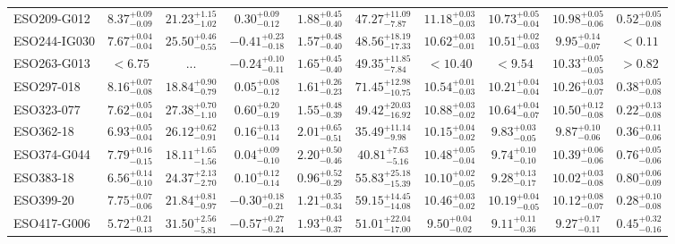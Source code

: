 \documentclass[onecolumn]{mn2e}
\begin{document}
\begin{landscape}
{\begin{center}
\begin{longtable}{lccccccccc}
ESO209-G012 & $8.37_{-0.09}^{+0.09}$ & $21.23_{-1.02}^{+1.15}$ & $0.30_{-0.12}^{+0.09}$ & $1.88_{-0.40}^{+0.45}$ &$47.27_{-7.87}^{+11.09}$ & $11.18_{-0.03}^{+0.03}$ & $10.73_{-0.04}^{+0.05}$ & $10.98_{-0.06}^{+0.05}$ & $0.52_{-0.08}^{+0.05}$ \\
ESO244-IG030 & $7.67_{-0.04}^{+0.04}$ & $25.50_{-0.55}^{+0.46}$ & $-0.41_{-0.18}^{+0.23}$ & $1.57_{-0.40}^{+0.48}$ &$48.56_{-17.33}^{+18.19}$ & $10.62_{-0.01}^{+0.03}$ & $10.51_{-0.03}^{+0.02}$ & $9.95_{-0.07}^{+0.14}$ & $<0.11$ \\
ESO263-G013 & $<6.75$ & ... & $-0.24_{-0.11}^{+0.10}$ & $1.65_{-0.40}^{+0.45}$ &$49.35_{-7.84}^{+11.85}$ & $<10.40$ & $<9.54$ & $10.33_{-0.05}^{+0.05}$ & $>0.82$ \\
ESO297-018 & $8.16_{-0.08}^{+0.07}$ & $18.84_{-0.79}^{+0.90}$ & $0.05_{-0.12}^{+0.08}$ & $1.61_{-0.23}^{+0.26}$ &$71.45_{-10.75}^{+12.98}$ & $10.54_{-0.03}^{+0.01}$ & $10.21_{-0.04}^{+0.04}$ & $10.26_{-0.07}^{+0.03}$ & $0.38_{-0.08}^{+0.05}$ \\
ESO323-077 & $7.62_{-0.04}^{+0.05}$ & $27.38_{-1.10}^{+0.70}$ & $0.60_{-0.19}^{+0.20}$ & $1.55_{-0.39}^{+0.48}$ &$49.42_{-16.92}^{+20.03}$ & $10.88_{-0.02}^{+0.03}$ & $10.64_{-0.07}^{+0.04}$ & $10.50_{-0.08}^{+0.12}$ & $0.22_{-0.08}^{+0.13}$ \\
ESO362-18 & $6.93_{-0.04}^{+0.05}$ & $26.12_{-0.91}^{+0.62}$ & $0.16_{-0.14}^{+0.13}$ & $2.01_{-0.51}^{+0.65}$ &$35.49_{-9.98}^{+11.14}$ & $10.15_{-0.02}^{+0.04}$ & $9.83_{-0.05}^{+0.03}$ & $9.87_{-0.06}^{+0.10}$ & $0.36_{-0.06}^{+0.11}$ \\
ESO374-G044 & $7.79_{-0.15}^{+0.16}$ & $18.11_{-1.56}^{+1.65}$ & $0.04_{-0.10}^{+0.09}$ & $2.20_{-0.46}^{+0.50}$ &$40.81_{-5.16}^{+7.63}$ & $10.48_{-0.04}^{+0.05}$ & $9.74_{-0.10}^{+0.10}$ & $10.39_{-0.06}^{+0.06}$ & $0.76_{-0.06}^{+0.05}$ \\
ESO383-18 & $6.56_{-0.10}^{+0.14}$ & $24.37_{-2.70}^{+2.13}$ & $0.10_{-0.14}^{+0.12}$ & $0.96_{-0.29}^{+0.52}$ &$55.83_{-15.39}^{+25.18}$ & $10.10_{-0.05}^{+0.02}$ & $9.28_{-0.17}^{+0.13}$ & $10.02_{-0.08}^{+0.03}$ & $0.80_{-0.09}^{+0.06}$ \\
ESO399-20 & $7.75_{-0.06}^{+0.07}$ & $21.84_{-0.97}^{+0.81}$ & $-0.30_{-0.21}^{+0.18}$ & $1.21_{-0.34}^{+0.35}$ &$59.15_{-14.08}^{+14.45}$ & $10.46_{-0.02}^{+0.03}$ & $10.19_{-0.05}^{+0.04}$ & $10.12_{-0.07}^{+0.08}$ & $0.28_{-0.08}^{+0.10}$ \\
ESO417-G006 & $5.72_{-0.13}^{+0.21}$ & $31.50_{-5.81}^{+2.56}$ & $-0.57_{-0.24}^{+0.27}$ & $1.93_{-0.37}^{+0.43}$ &$51.01_{-17.00}^{+22.04}$ & $9.50_{-0.02}^{+0.04}$ & $9.11_{-0.36}^{+0.11}$ & $9.27_{-0.11}^{+0.17}$ & $0.45_{-0.16}^{+0.32}$ \\

\end{longtable}
\end{center}}
\end{landscape}
\end{document}
